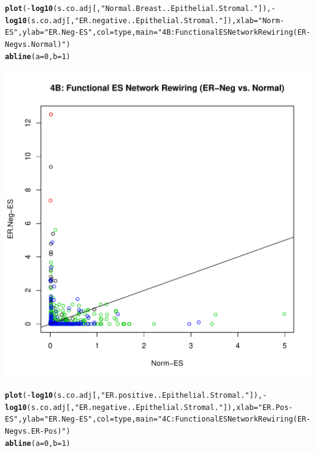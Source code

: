 \documentclass{article}\usepackage[]{graphicx}\usepackage[]{color}
\makeatletter
\def\maxwidth{ %
  \ifdim\Gin@nat@width>\linewidth
    \linewidth
  \else
    \Gin@nat@width
  \fi
}
\newcommand{\hlnum}[1]{\textcolor[rgb]{0.686,0.059,0.569}{#1}}%
\newcommand{\hlstr}[1]{\textcolor[rgb]{0.192,0.494,0.8}{#1}}%
\newcommand{\hlopt}[1]{\textcolor[rgb]{0,0,0}{#1}}%
\newcommand{\hlstd}[1]{\textcolor[rgb]{0.345,0.345,0.345}{#1}}%
\newcommand{\hlkwc}[1]{\textcolor[rgb]{0.333,0.667,0.333}{#1}}%
\newcommand{\hlkwd}[1]{\textcolor[rgb]{0.737,0.353,0.396}{\textbf{#1}}}%
\newenvironment{kframe}{%
 \def\at@end@of@kframe{}%
 \ifinner\ifhmode%
  \def\at@end@of@kframe{\end{minipage}}%
  \begin{minipage}{\columnwidth}%
 \fi\fi%
 \def\FrameCommand##1{\hskip\@totalleftmargin \hskip-\fboxsep
 \colorbox{shadecolor}{##1}\hskip-\fboxsep
     \hskip-\linewidth \hskip-\@totalleftmargin \hskip\columnwidth}%
 \MakeFramed {\advance\hsize-\width
   \@totalleftmargin\z@ \linewidth\hsize
   \@setminipage}}%
 {\par\unskip\endMakeFramed%
 \at@end@of@kframe}
\newenvironment{knitrout}{}{} %
\makeatother
\begin{document}
\begin{knitrout}
\begin{kframe}\begin{alltt}
\hlkwd{plot}\hlstd{(}\hlopt{-}\hlkwd{log10}\hlstd{(s.co.adj[,}\hlstr{"Normal.Breast..Epithelial.Stromal."}\hlstd{]),}\hlopt{-}\hlkwd{log10}\hlstd{(s.co.adj[,}\hlstr{"ER.negative..Epithelial.Stromal."}  \hlstd{]),}\hlkwc{xlab}\hlstd{=}\hlstr{"Norm-ES"}\hlstd{,}\hlkwc{ylab}\hlstd{=}\hlstr{"ER.Neg-ES"}\hlstd{,}\hlkwc{col}\hlstd{=type,} \hlkwc{main} \hlstd{=} \hlstr{"4B: Functional ES Network Rewiring (ER-Neg vs. Normal)"}\hlstd{)}
\hlkwd{abline}\hlstd{(}\hlkwc{a}\hlstd{=}\hlnum{0}\hlstd{,}\hlkwc{b}\hlstd{=}\hlnum{1}\hlstd{)}
\end{alltt}
\end{kframe}
\includegraphics[width=\maxwidth]{figure/Figure_4__Analysis_of_SANTA_Results-2} 
\begin{kframe}\begin{alltt}
\hlkwd{plot}\hlstd{(}\hlopt{-}\hlkwd{log10}\hlstd{(s.co.adj[,}\hlstr{"ER.positive..Epithelial.Stromal."}\hlstd{]),}\hlopt{-}\hlkwd{log10}\hlstd{(s.co.adj[,}\hlstr{"ER.negative..Epithelial.Stromal."}\hlstd{]),}\hlkwc{xlab}\hlstd{=}\hlstr{"ER.Pos-ES"}\hlstd{,}\hlkwc{ylab}\hlstd{=}\hlstr{"ER.Neg-ES"}\hlstd{,}\hlkwc{col}\hlstd{=type,}\hlkwc{main} \hlstd{=} \hlstr{"4C: Functional ES Network Rewiring (ER-Neg vs. ER-Pos)"}\hlstd{)}
\hlkwd{abline}\hlstd{(}\hlkwc{a}\hlstd{=}\hlnum{0}\hlstd{,}\hlkwc{b}\hlstd{=}\hlnum{1}\hlstd{)}

\end{alltt}
\end{kframe}
\end{knitrout}
\end{document}
